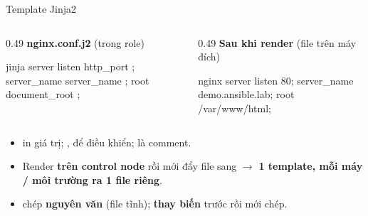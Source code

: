 \documentclass[aspectratio=169,11pt,xcolor=table]{beamer}
\begin{document}
\begin{frame}[fragile]{Template Jinja2}
  \begin{columns}[t]
    \begin{column}{0.49\textwidth}
      {\small\textbf{nginx.conf.j2} (trong role)}
\begin{codeblock}[minted options={fontsize=\scriptsize}]{jinja}
server {
    listen {{ http_port }};
    server_name {{ server_name }};
    root {{ document_root }};
}
\end{codeblock}
    \end{column}
    \begin{column}{0.49\textwidth}
      {\small\textbf{Sau khi render} (file trên máy đích)}
\begin{codeblock}[minted options={fontsize=\scriptsize}]{nginx}
server {
    listen 80;
    server_name demo.ansible.lab;
    root /var/www/html;
}
\end{codeblock}
    \end{column}
  \end{columns}
  \vspace{0.3cm}
  \begin{itemize}\small\setlength{\itemsep}{0.15cm}
    \item {} in giá trị; ,  để điều khiển;
          \code{\{\# \#\}} là comment.
    \item Render \textbf{trên control node} rồi mới đẩy file sang $\rightarrow$
          \textbf{1 template, mỗi máy / môi trường ra 1 file riêng}.
    \item {} chép \textbf{nguyên văn} (file tĩnh);  \textbf{thay biến} trước rồi mới chép.
  \end{itemize}
\end{frame}
\end{document}
